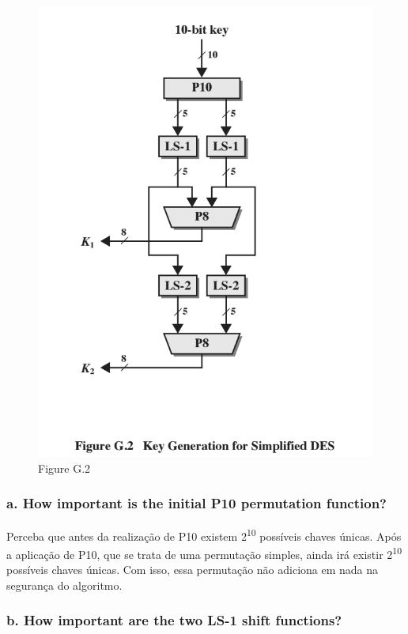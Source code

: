 \documentclass[12pt]{article}
\begin{document}
  \begin{figure}[h]
    \includegraphics[width=\linewidth]{s_des_key_generation}
    \caption{Figure G.2}
  \end{figure}

  \subsubsection*{a. How important is the initial P10 permutation function?}

    Perceba que antes da realização de P10 existem 2\textsuperscript{10}
    possíveis chaves únicas. Após a aplicação de P10, que se trata de uma
    permutação simples, ainda irá existir 2\textsuperscript{10} possíveis chaves
    únicas. Com isso, essa permutação não adiciona em nada na segurança do
    algoritmo.

  \subsubsection*{b. How important are the two LS-1 shift functions?}
\end{document}
